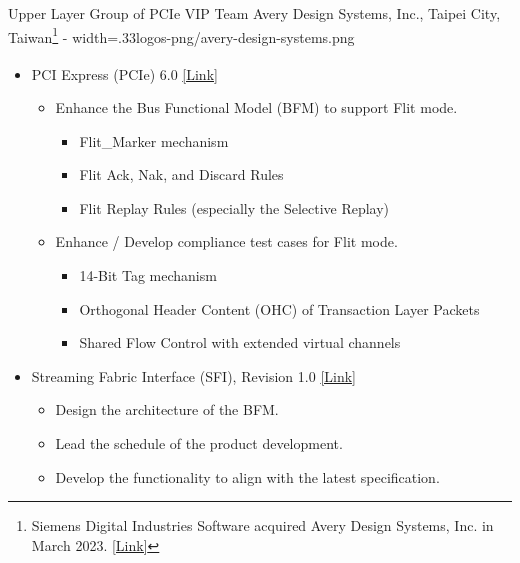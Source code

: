 \documentclass{cvclass}
\newcommand{\simplemmyy}[3]{\shortmmyyformat\formatdate{#3}{#2}{#1}}
\begin{document}
    {Upper Layer Group of PCIe VIP Team}
    {Avery Design Systems, Inc., Taipei City, Taiwan\footnote{Siemens Digital Industries Software acquired Avery Design Systems, Inc. in March 2023. \href{https://newsroom.sw.siemens.com/en-US/siemens-avery-design-systems/}{[Link]}}}
    {\simplemmyy{2021}{7}{19} - \simplemmyy{2023}{4}{10}}
    {width=.33\linewidth}{logos-png/avery-design-systems.png}
    {\begin{itemize}
        \item PCI Express\textsuperscript{\tiny\textregistered} (PCIe\textsuperscript{\tiny\textregistered}) 6.0 \href{https://pcisig.com/pci-express-6.0-specification}{[Link]}
        \begin{itemize}
            \item Enhance the Bus Functional Model (BFM) to support Flit mode.
            \begin{itemize}
                \item Flit\_Marker mechanism
                \item Flit Ack, Nak, and Discard Rules
                \item Flit Replay Rules (especially the Selective Replay)
            \end{itemize}
            \item Enhance / Develop compliance test cases for Flit mode.
            \begin{itemize}
                \item 14-Bit Tag mechanism
                \item Orthogonal Header Content (OHC) of Transaction Layer Packets
                \item Shared Flow Control with extended virtual channels
            \end{itemize}
        \end{itemize}
        \item Streaming Fabric Interface (SFI), Revision 1.0 \href{https://www.intel.com/content/www/us/en/content-details/644200/streaming-fabric-interface-sfi-specification.html}{[Link]}
        \begin{itemize}
            \item Design the architecture of the BFM.
            \item Lead the schedule of the product development.
            \item Develop the functionality to align with the latest specification.

\end{itemize}
\end{itemize}}
\end{document}
